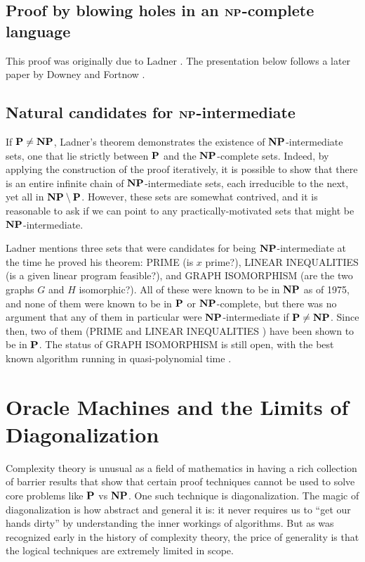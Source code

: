 \documentclass[11pt,twoside=off,numbers=noenddot]{scrbook}
\begin{document}
\subsection{Proof by blowing holes in an $\textbf{NP}$-complete language}
This proof was originally due to Ladner \cite{ladner1975structure}. The presentation below follows a later paper by Downey and Fortnow \cite{downey2003uniformly}.

\subsection{Natural candidates for $\textbf{NP}$-intermediate}
If $\textbf{P} \neq \textbf{NP}$, Ladner's theorem demonstrates the existence of $\textbf{NP}$-intermediate sets, one that lie strictly between $\textbf{P}$ and the $\textbf{NP}$-complete sets. Indeed, by applying the construction of the proof iteratively, it is possible to show that there is an entire infinite chain of $\textbf{NP}$-intermediate sets, each irreducible to the next, yet all in $\textbf{NP} \setminus \textbf{P}$. However, these sets are somewhat contrived, and it is reasonable to ask if we can point to any practically-motivated sets that might be $\textbf{NP}$-intermediate.

Ladner \cite{ladner1975structure} mentions three sets that were candidates for being $\textbf{NP}$-intermediate at the time he proved his theorem: PRIME (is $x$ prime?), LINEAR INEQUALITIES (is a given linear program feasible?), and GRAPH ISOMORPHISM (are the two graphs $G$ and $H$ isomorphic?). All of these were known to be in $\textbf{NP}$ as of 1975, and none of them were known to be in $\textbf{P}$ or $\textbf{NP}$-complete, but there was no argument that any of them in particular were $\textbf{NP}$-intermediate if $\textbf{P} \neq \textbf{NP}$. Since then, two of them (PRIME \cite{agrawal2004primes} and LINEAR INEQUALITIES \cite{khachiyan1980polynomial}) have been shown to be in $\textbf{P}$. The status of GRAPH ISOMORPHISM is still open, with the best known algorithm running in quasi-polynomial time \cite{babai2016graph}.

\section{Oracle Machines and the Limits of Diagonalization}
Complexity theory is unusual as a field of mathematics in having a rich collection of barrier results that show that certain proof techniques cannot be used to solve core problems like $\textbf{P}$ vs $\textbf{NP}$. One such technique is diagonalization. The magic of diagonalization is how abstract and general it is: it never requires us to ``get our hands dirty'' by understanding the inner workings of algorithms. But as was recognized early in the history of complexity theory, the price of generality is that the logical techniques are extremely limited in scope.
\end{document}
